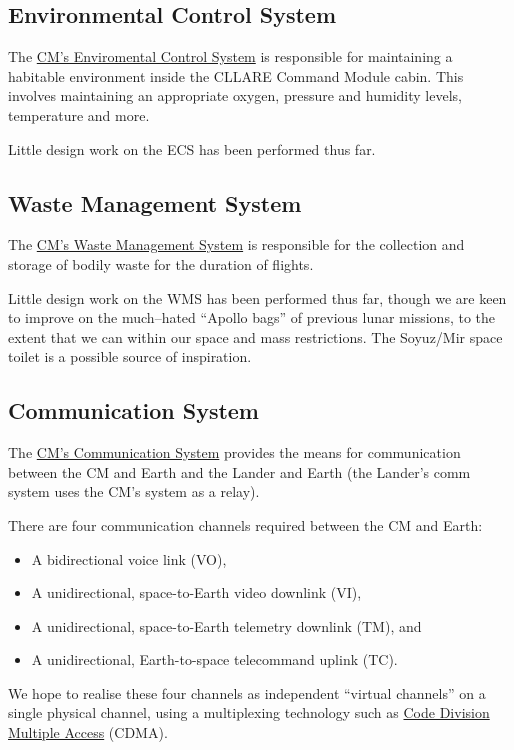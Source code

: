 \documentclass{report}
\begin{document}
\subsection{Environmental Control System}

The \href{http://cstart.org/wiki/CLLARE_Environmental_Control_System}{CM's Enviromental Control System} is responsible for maintaining a habitable environment inside the CLLARE Command Module cabin. This involves maintaining an appropriate oxygen, pressure and humidity levels, temperature and more.

Little design work on the ECS has been performed thus far.

\subsection{Waste Management System}

The \href{http://cstart.org/wiki/CLLARE_Waste_Management_System}{CM's Waste Management System} is responsible for the collection and storage of bodily waste for the duration of flights.

Little design work on the WMS has been performed thus far, though we are keen to improve on the much--hated ``Apollo bags'' of previous lunar missions, to the extent that we can within our space and mass restrictions.  The Soyuz/Mir space toilet is a possible source of inspiration.

\subsection{Communication System}

The \href{http://cstart.org/wiki/CLLARE_CM_Communication_System}{CM's Communication System} provides the means for communication between the CM and Earth and the Lander and Earth (the Lander's comm system uses the CM's system as a relay).

There are four communication channels required between the CM and Earth:
\begin{itemize}
\item A bidirectional voice link (VO),
\item A unidirectional, space-to-Earth video downlink (VI),
\item A unidirectional, space-to-Earth telemetry downlink (TM), and
\item A unidirectional, Earth-to-space telecommand uplink (TC).
\end{itemize}
We hope to realise these four channels as independent ``virtual channels'' on a single physical channel, using a multiplexing technology such as \href{http://en.wikipedia.org/wiki/Code_division_multiple_access}{Code Division Multiple Access} (CDMA).
\end{document}
